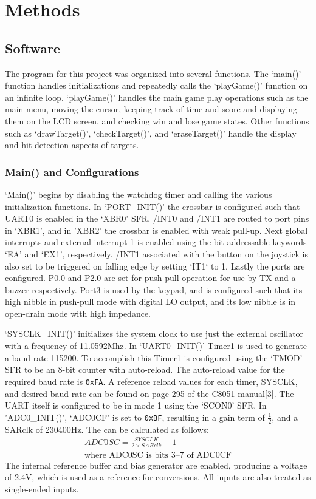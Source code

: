 \documentclass[12pt]{article}
\begin{document}
\section{Methods}
\subsection{Software}
The program for this project was organized into several functions. The `main()' function handles initializations and repeatedly calls the `playGame()' function on an infinite loop. `playGame()' handles the main game play operations such as the main menu, moving the cursor, keeping track of time and score and displaying them on the LCD screen, and checking win and lose game states. Other functions such as `drawTarget()', `checkTarget()', and `eraseTarget()' handle the display and hit detection aspects of targets. 

\subsubsection{Main() and Configurations}
`Main()' begins by disabling the watchdog timer and calling the various initialization functions. In `PORT\_INIT()' the crossbar is configured such that UART0 is enabled in the `XBR0' SFR, /INT0 and /INT1 are routed to port pins in `XBR1', and in 'XBR2' the crossbar is enabled with weak pull-up. Next global interrupts and external interrupt 1 is enabled using the bit addressable keywords `EA' and `EX1', respectively. /INT1 associated with the button on the joystick is also set to be triggered on falling edge by setting `IT1` to 1. Lastly the ports are configured. P0.0 and P2.0 are set for push-pull operation for use by TX and a buzzer respectively. Port3 is used by the keypad, and is configured such that its high nibble in push-pull mode with digital LO output, and its low nibble is in open-drain mode with high impedance. 

`SYSCLK\_INIT()' initializes the system clock to use just the external oscillator with a frequency of 11.0592\si{Mhz}. In `UART0\_INIT()' Timer1 is used to generate a baud rate 115200. To accomplish this Timer1 is configured using the `TMOD' SFR to be an 8-bit counter with auto-reload. The auto-reload value for the required baud rate is \texttt{0xFA}. A reference reload values for each timer, SYSCLK, and desired baud rate can be found on page 295 of the C8051 manual[3]. The UART itself is configured to be in mode 1 using the `SCON0' SFR. In 'ADC0\_INIT()', `ADC0CF' is set to \texttt{0xBF}, resulting in a gain term of $\frac{1}{2}$, and a SARclk of 230400\si{Hz}. The can be calculated as follows: 
\begin{gather*}
	ADC0SC=\frac{SYSCLK}{2\times SARclk}-1\\
	\textrm{where ADC0SC is bits 3--7 of ADC0CF}
\end{gather*}
The internal reference buffer and bias generator are enabled, producing a voltage of 2.4\si{V}, which is used as a reference for conversions. All inputs are also treated as single-ended inputs.
\end{document}
